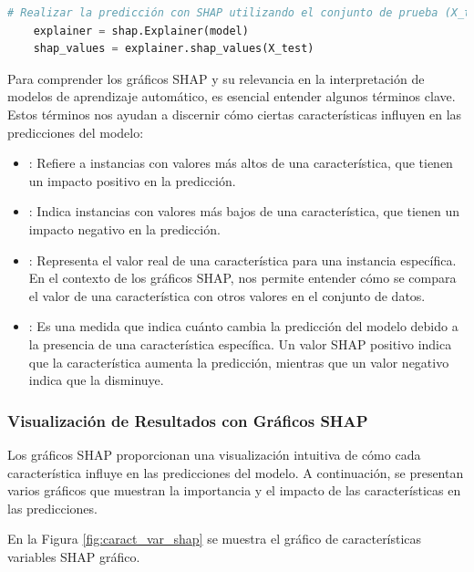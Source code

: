 \begin{lstlisting}[language=Python, caption=Predicción con SHAP utilizando el conjunto de prueba, label=lst:shap_analysis]
    # Realizar la predicción con SHAP utilizando el conjunto de prueba (X_test)
    explainer = shap.Explainer(model)
    shap_values = explainer.shap_values(X_test)
\end{lstlisting}


Para comprender los gráficos SHAP y su relevancia en la interpretación de modelos de aprendizaje automático, es esencial entender algunos términos clave. Estos términos nos ayudan a discernir cómo ciertas características influyen en las predicciones del modelo:

\begin{itemize}
    \item {}: Refiere a instancias con valores más altos de una característica, que tienen un impacto positivo en la predicción.
    
    \item {}: Indica instancias con valores más bajos de una característica, que tienen un impacto negativo en la predicción.
    
    \item {}: Representa el valor real de una característica para una instancia específica. En el contexto de los gráficos SHAP, nos permite entender cómo se compara el valor de una característica con otros valores en el conjunto de datos.
    
    \item {}: Es una medida que indica cuánto cambia la predicción del modelo debido a la presencia de una característica específica. Un valor SHAP positivo indica que la característica aumenta la predicción, mientras que un valor negativo indica que la disminuye.
\end{itemize}


\subsubsection{Visualización de Resultados con Gráficos SHAP}

Los gráficos SHAP proporcionan una visualización intuitiva de cómo cada característica influye en las predicciones del modelo. A continuación, se presentan varios gráficos que muestran la importancia y el impacto de las características en las predicciones.

En la Figura \ref{fig:caract_var_shap} se muestra el gráfico de características variables SHAP gráfico.

